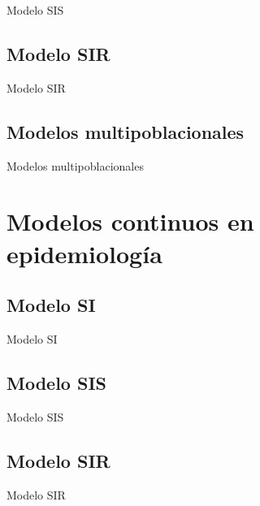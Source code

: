 \begin{frame}{Modelo SIS}

\end{frame}


\subsection{Modelo SIR}


\begin{frame}{Modelo SIR}

\end{frame}


\subsection{Modelos multipoblacionales}


\begin{frame}{Modelos multipoblacionales}

\end{frame}




\section{Modelos continuos en epidemiología}


\subsection{Modelo SI}


\begin{frame}{Modelo SI}

\end{frame}


\subsection{Modelo SIS}


\begin{frame}{Modelo SIS}

\end{frame}


\subsection{Modelo SIR}


\begin{frame}{Modelo SIR}

\end{frame}


